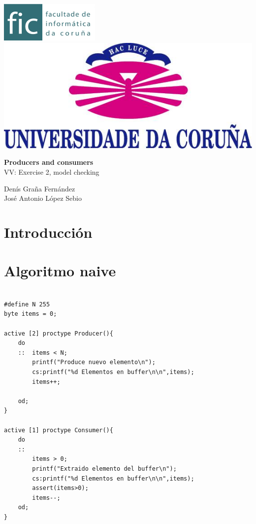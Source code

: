 \documentclass[a4paper,12pt]{article}
\begin{document}
\vspace{2cm}
\includegraphics[scale=0.75]{logo_fic_185.png}\hspace{5cm} 
\includegraphics[scale=0.35]{logo-udc.jpg}\\
[2cm]
\begin{center}
  \Large \textbf{Producers and consumers}\\ VV: Exercise 2, model checking
\end{center}


\vspace{10cm}
\begin{flushright}
Denís Graña Fernández \\
José Antonio López Sebio \\
[2cm]
\end{flushright}

\newpage
\tableofcontents
\newpage

\section{Introducción}


\section{Algoritmo naive}

\lstset{
	language=C,
	tabsize=2,  
	showspaces=false,     
	breakatwhitespace=false,
	showstringspaces=false
	}          %

\begin{lstlisting}[frame=single]  % Start your code-block

#define N 255
byte items = 0;

active [2] proctype Producer(){
	do
	::	items < N;
		printf("Produce nuevo elemento\n");
		cs:printf("%d Elementos en buffer\n\n",items);
		items++;
		
	od;
}

active [1] proctype Consumer(){
	do
	::	 
		items > 0;
		printf("Extraido elemento del buffer\n");
		cs:printf("%d Elementos en buffer\n\n",items);
		assert(items>0);
		items--;
	od;
}
\end{lstlisting}
\end{document}
